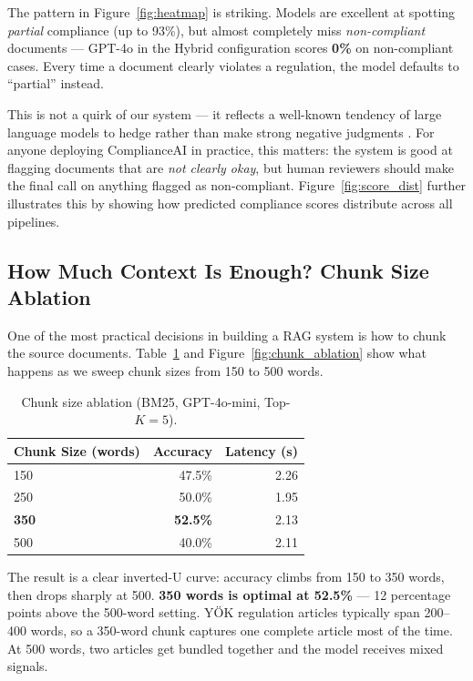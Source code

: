 The pattern in Figure~\ref{fig:heatmap} is striking.
Models are excellent at spotting \textit{partial} compliance (up to 93\%),
but almost completely miss \textit{non-compliant} documents ---
GPT-4o in the Hybrid configuration scores \textbf{0\%} on non-compliant cases.
Every time a document clearly violates a regulation, the model defaults
to ``partial'' instead.

This is not a quirk of our system --- it reflects a well-known tendency of
large language models to hedge rather than make strong negative
judgments \citep{Fazlija2024, Deshpande2024}.
For anyone deploying ComplianceAI in practice, this matters:
the system is good at flagging documents that are \textit{not clearly okay},
but human reviewers should make the final call on anything flagged as
non-compliant. Figure~\ref{fig:score_dist} further illustrates this
by showing how predicted compliance scores distribute across all pipelines.

\subsection{How Much Context Is Enough? Chunk Size Ablation}

One of the most practical decisions in building a RAG system is how to
chunk the source documents.
Table~\ref{tab:chunk_ablation} and Figure~\ref{fig:chunk_ablation} show
what happens as we sweep chunk sizes from 150 to 500 words.

\begin{table}[H]
\centering
\footnotesize
\caption{Chunk size ablation (BM25, GPT-4o-mini, Top-$K{=}5$).}
\label{tab:chunk_ablation}
\begin{tabular}{lrr}
\toprule
Chunk Size (words) & Accuracy & Latency (s) \\
\midrule
150                & 47.5\%   & 2.26 \\
250                & 50.0\%   & 1.95 \\
\textbf{350}       & \textbf{52.5\%} & 2.13 \\
500                & 40.0\%   & 2.11 \\
\bottomrule
\end{tabular}
\end{table}

The result is a clear inverted-U curve: accuracy climbs from 150 to 350
words, then drops sharply at 500.
\textbf{350 words is optimal at 52.5\%} --- 12 percentage points above
the 500-word setting.
YÖK regulation articles typically span 200--400 words, so a 350-word chunk
captures one complete article most of the time.
At 500 words, two articles get bundled together and the model receives
mixed signals.

